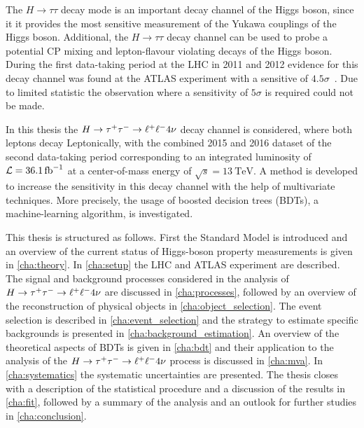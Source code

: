 The $H \to \tau\tau$ decay mode is an important decay channel of the Higgs boson, since it it provides the most sensitive measurement
of the Yukawa couplings of the Higgs boson.
Additional, the $H \to \tau\tau$ decay channel can be used to probe a potential CP mixing and lepton-flavour violating decays of the Higgs boson.
During the first data-taking period at the LHC in 2011 and 2012 evidence for this decay channel was found at the ATLAS experiment with
a sensitive of $4.5\sigma$~\cite{HTauTauRun1}.
Due to limited statistic the observation where a sensitivity of $5\sigma$ is required could not be made.

In this thesis the $H \to \tau^+\tau^- \to \ell^+\ell^- 4\nu$ decay channel is considered, where both leptons decay Leptonically, with the
combined 2015 and 2016 dataset of the second data-taking period corresponding to an integrated luminosity of $\lumi = \SI{36.1}{\invfb}$
at a center-of-mass energy of $\sqrt{s} = \SI{13}{\TeV}$.
A method is developed to increase the sensitivity in this decay channel with the help of multivariate techniques.
More precisely, the usage of boosted decision trees (BDTs), a machine-learning algorithm, is investigated.

This thesis is structured as follows.
First the Standard Model is introduced and an overview of the current status of Higgs-boson property measurements is given in \cref{cha:theory}.
In \cref{cha:setup} the LHC and ATLAS experiment are described.
The signal and background processes considered in the analysis of $H \to \tau^+\tau^- \to \ell^+\ell^- 4\nu$ are discussed in \cref{cha:processes}, followed by an overview
of the reconstruction of physical objects in \cref{cha:object_selection}.
The event selection is described in \cref{cha:event_selection} and the strategy to estimate specific backgrounds
is presented in \cref{cha:background_estimation}.
An overview of the theoretical aspects of BDTs is given in \cref{cha:bdt} and their application to the analysis of the $H \to \tau^+\tau^- \to \ell^+\ell^- 4\nu$ process
is discussed in \cref{cha:mva}.
In \cref{cha:systematics} the systematic uncertainties are presented.
The thesis closes with a description of the statistical procedure and a discussion of the results in \cref{cha:fit}, followed
by a summary of the analysis and an outlook for further studies in \cref{cha:conclusion}.
